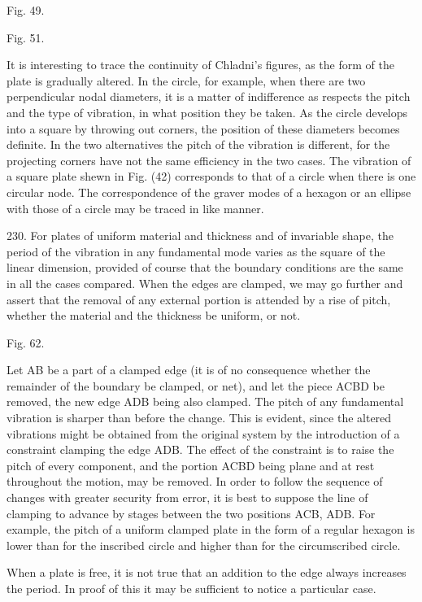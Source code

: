 Fig. 49.

Fig. 51.

It is interesting to trace the continuity of Chladni's figures, as the
form of the plate is gradually altered. In the circle, for example, when
there are two perpendicular nodal diameters, it is a matter of
indifference as respects the pitch and the type of vibration, in what
position they be taken. As the circle develops into a square by throwing
out corners, the position of these diameters becomes definite. In the
two alternatives the pitch of the vibration is different, for the
projecting corners have not the same efficiency in the two cases. The
vibration of a square plate shewn in Fig. (42) corresponds to that of a
circle when there is one circular node. The correspondence of the graver
modes of a hexagon or an ellipse with those of a circle may be traced in
like manner.

230. For plates of uniform material and thickness and of invariable
shape, the period of the vibration in any fundamental mode varies as the
square of the linear dimension, provided of course that the boundary
conditions are the same in all the cases compared. When the edges are
clamped, we may go further and assert that the removal of any external
portion is attended by a rise of pitch, whether the material and the
thickness be uniform, or not.

Fig. 62.

Let AB be a part of a clamped edge
(it is of no consequence whether the remainder of the boundary be clamped, or net), and
let the piece ACBD be removed, the new edge ADB being also clamped. The
pitch of any fundamental vibration is sharper than before the change.
This is evident, since the altered vibrations might be obtained from the
original system by the introduction of a constraint clamping the edge
ADB. The effect of the constraint is to raise the pitch of every
component, and the portion ACBD being plane and at rest throughout the
motion, may be removed. In order to follow the sequence of changes with
greater security from error, it is best to suppose the line of clamping
to advance by stages between the two positions ACB, ADB. For example,
the pitch of a uniform clamped plate
in the form of a regular hexagon is lower than for the inscribed circle
and higher than for the circumscribed circle.

When a plate is free, it is not true that an addition to the edge always
increases the period. In proof of this it may be sufficient to notice
a particular case.

